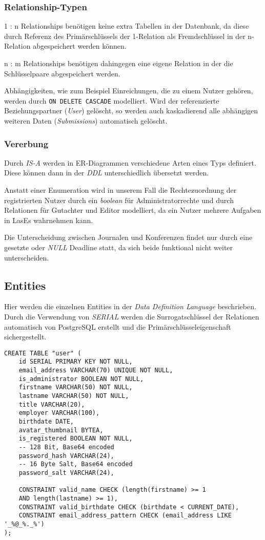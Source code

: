 \subsubsection{Relationship-Typen}

1 : n Relationships benötigen keine extra Tabellen in der Datenbank, da diese durch Referenz des Primärschlüssels der 1-Relation als Fremdschlüssel in der n-Relation abgespeichert werden können.

n : m Relationships benötigen dahingegen eine eigene Relation in der die Schlüsselpaare abgespeichert werden.

Abhängigkeiten, wie zum Beispiel Einreichungen, die zu einem Nutzer gehören, werden durch \texttt{ON DELETE CASCADE} modelliert. Wird der referenzierte Beziehungspartner (\emph{User}) gelöscht, so werden auch kaskadierend alle abhängigen weiteren Daten (\emph{Submissions}) automatisch gelöscht.

\subsubsection{Vererbung}

Durch \emph{IS-A} werden in ER-Diagrammen verschiedene Arten eines Typs definiert. Diese können dann in der \emph{DDL} unterschiedlich übersetzt werden.

Anstatt einer Enumeration wird in unserem Fall die Rechtezuordnung der registrierten Nutzer durch ein \emph{boolean} für Administratorrechte und durch Relationen für Gutachter und Editor modelliert, da ein Nutzer mehrere Aufgaben in LasEs wahrnehmen kann.

Die Unterscheidung zwischen Journalen und Konferenzen findet nur durch eine gesetzte oder \emph{NULL} Deadline statt, da sich beide funktional nicht weiter unterscheiden.

\subsection{Entities}

Hier werden die einzelnen Entities in der \emph{Data Definition Language} beschrieben. Durch die Verwendung von \emph{SERIAL} werden die Surrogatschlüssel der Relationen automatisch von PostgreSQL erstellt und die Primärschlüsseleigenschaft sichergestellt.\\

\begin{lstlisting}[caption={DDL von Nutzern}]
CREATE TABLE "user" (
	id SERIAL PRIMARY KEY NOT NULL,
	email_address VARCHAR(70) UNIQUE NOT NULL,
	is_administrator BOOLEAN NOT NULL,
	firstname VARCHAR(50) NOT NULL,
	lastname VARCHAR(50) NOT NULL,
	title VARCHAR(20),
	employer VARCHAR(100),
	birthdate DATE,
	avatar_thumbnail BYTEA,
	is_registered BOOLEAN NOT NULL,
	-- 128 Bit, Base64 encoded
	password_hash VARCHAR(24),
	-- 16 Byte Salt, Base64 encoded
	password_salt VARCHAR(24),

	CONSTRAINT valid_name CHECK (length(firstname) >= 1
	AND length(lastname) >= 1),
	CONSTRAINT valid_birthdate CHECK (birthdate < CURRENT_DATE),
	CONSTRAINT email_address_pattern CHECK (email_address LIKE '_%@_%._%')
);
\end{lstlisting}

